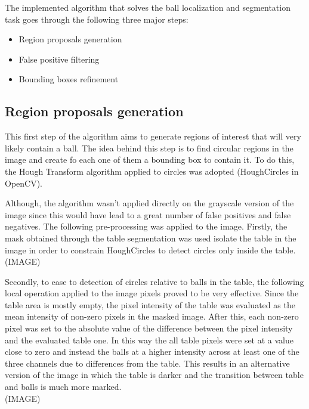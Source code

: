 The implemented algorithm that solves the ball localization and segmentation task 
goes through the following three major steps:
\begin{itemize}
    \item Region proposals generation
    \item False positive filtering
    \item Bounding boxes refinement
\end{itemize}


\subsection*{Region proposals generation}
This first step of the algorithm aims to generate regions of interest that will very likely 
contain a ball. The idea behind this step is to find circular regions in the image and create fo each one of them
a bounding box to contain it. To do this, the Hough Transform algorithm applied to circles was adopted
(HoughCircles in OpenCV).

Although, the algorithm wasn't applied directly on the grayscale version of the image since
this would have lead to a great number of false positives and false negatives. The following
pre-processing was applied to the image.
Firstly, the mask obtained through the table segmentation was used isolate the table in the image
in order to constrain HoughCircles to detect circles only inside the table. \\
(IMAGE)

Secondly, to ease to detection of circles relative to balls in the table, the following local operation applied to the image pixels
proved to be very effective. Since the table area is mostly empty, the pixel intensity of the table
was evaluated as the mean intensity of non-zero pixels in the masked image. After this, each non-zero pixel
was set to the absolute value of the difference between the pixel intensity and the evaluated table one.
In this way the all table pixels were set at a value close to zero and instead the balls at a higher intensity
across at least one of the three channels due to differences from the table.
This results in an alternative version of the image in which the table is darker and the transition
between table and balls is much more marked. \\
(IMAGE)

